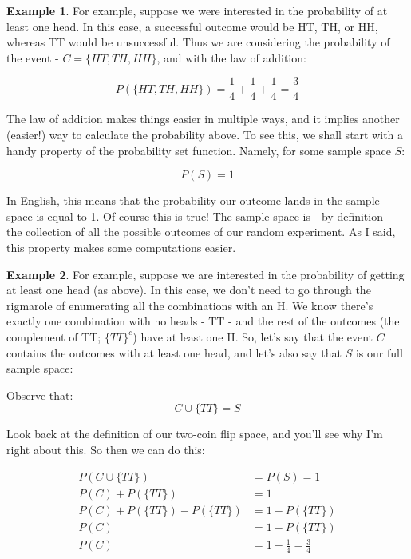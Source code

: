 \documentclass[
]{book}
\theoremstyle{definition}
\theoremstyle{definition}
\newtheorem{example}{Example}[chapter]
\theoremstyle{definition}
\theoremstyle{definition}
\theoremstyle{remark}
\begin{document}
\begin{example}
For example, suppose we were interested in the probability of at least one head. In this case, a successful outcome would be HT, TH, or HH, whereas TT would be unsuccessful. Thus we are considering the probability of the event - \(C = \{HT, TH, HH\}\), and with the law of addition:

\[ 
P(\{HT,TH, HH\}) = \frac{1}{4} + \frac{1}{4} + \frac{1}{4} = \frac{3}{4}
\label{eq:setadd}
\]
\end{example}

The law of addition makes things easier in multiple ways, and it implies another (easier!) way to calculate the probability above. To see this, we shall start with a handy property of the probability set function. Namely, for some sample space \(S\):

\[ P(S) = 1 
\label{eq:setprop}\]

In English, this means that the probability our outcome lands in the sample space is equal to 1. Of course this is true! The sample space is - by definition - the collection of all the possible outcomes of our random experiment. As I said, this property makes some computations easier.

\begin{example}
For example, suppose we are interested in the probability of getting at least one head (as above). In this case, we don't need to go through the rigmarole of enumerating all the combinations with an H. We know there's exactly one combination with no heads - TT - and the rest of the outcomes (the complement of TT; \(\{TT\}^c\)) have at least one H. So, let's say that the event \(C\) contains the outcomes with at least one head, and let's also say that \(S\) is our full sample space:

Observe that:
\[ C \cup \{TT\} = S \]

Look back at the definition of our two-coin flip space, and you'll see why I'm right about this. So then we can do this:

\begin{align} 
P(C \cup \{TT\}) &= P(S) = 1 \\
P(C) + P(\{TT\}) &= 1 \\
P(C) + P(\{TT\}) - P(\{TT\}) &= 1 - P(\{TT\}) \\
P(C) &= 1 - P(\{TT\}) \\
P(C) &= 1 - \frac{1}{4} = \frac{3}{4}
\end{align}

\end{example}
\end{document}
